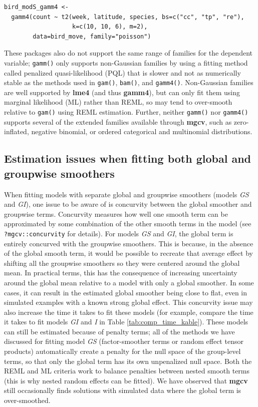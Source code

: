 \documentclass[12pt]{article}
\begin{document}
\begin{verbatim}
bird_modS_gamm4 <-
  gamm4(count ~ t2(week, latitude, species, bs=c("cc", "tp", "re"),
                   k=c(10, 10, 6), m=2),
        data=bird_move, family="poisson")
\end{verbatim}

These packages also do not support the same range of families for the
dependent variable; \texttt{gamm()} only supports non-Gaussian families
by using a fitting method called penalized quasi-likelihood (PQL) that
is slower and not as numerically stable as the methods used in
\texttt{gam()}, \texttt{bam()}, and \texttt{gamm4()}. Non-Gaussian
families are well supported by \textbf{lme4} (and thus \textbf{gamm4}),
but can only fit them using marginal likelihood (ML) rather than REML,
so may tend to over-smooth relative to \texttt{gam()} using REML
estimation. Further, neither \texttt{gamm()} nor \texttt{gamm4()}
supports several of the extended families available through
\textbf{mgcv}, such as zero-inflated, negative binomial, or ordered
categorical and multinomial distributions.

\subsection{Estimation issues when fitting both global and groupwise
smoothers}\label{estimation-issues-when-fitting-both-global-and-groupwise-smoothers}

When fitting models with separate global and groupwise smoothers (models
\emph{GS} and \emph{GI}), one issue to be aware of is concurvity between
the global smoother and groupwise terms. Concurvity measures how well
one smooth term can be approximated by some combination of the other
smooth terms in the model (see \texttt{?mgcv::concurvity} for details).
For models \emph{GS} and \emph{GI}, the global term is entirely
concurved with the groupwise smoothers. This is because, in the absence
of the global smooth term, it would be possible to recreate that average
effect by shifting all the groupwise smoothers so they were centered
around the global mean. In practical terms, this has the consequence of
increasing uncertainty around the global mean relative to a model with
only a global smoother. In some cases, it can result in the estimated
global smoother being close to flat, even in simulated examples with a
known strong global effect. This concurvity issue may also increase the
time it takes to fit these models (for example, compare the time it
takes to fit models \emph{GI} and \emph{I} in Table
\ref{tab:comp_time_kable}). These models can still be estimated because
of penalty terms; all of the methods we have discussed for fitting model
\emph{GS} (factor-smoother terms or random effect tensor products)
automatically create a penalty for the null space of the group-level
terms, so that only the global term has its own unpenalized null space.
Both the REML and ML criteria work to balance penalties between nested
smooth terms (this is why nested random effects can be fitted). We have
observed that \textbf{mgcv} still occasionally finds solutions with
simulated data where the global term is over-smoothed.
\end{document}
